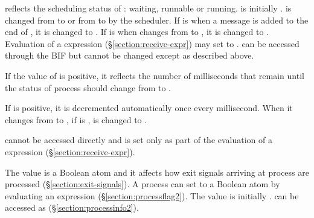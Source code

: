 \begin{Lentry}
\item[\T{status[\Z{P}]}]
 reflects the scheduling status of : waiting, runnable or running.
 is initially .
 is changed from  to
 or from  to  by the scheduler.
If  is  when a message is added to the end of
,
it is changed to .  If  is  when
 changes from  to , it is changed to .
Evaluation of a  expression (\S\ref{section:receive-expr}) may set
 to .
 can be accessed through the BIF  but
cannot be changed except as described above.

\item[\T{timer[\Z{P}]}]
If the value of  is positive, it reflects the number of milliseconds
that remain until the status of process  should change from
to .

If  is positive, it is decremented automatically once every millisecond.
When it changes from  to , if  is
,  is changed to .

 cannot be accessed directly and is set only as part of the evaluation of
a  expression (\S\ref{section:receive-expr}).

\item[\T{trap_exit[\Z{P}]}]
The value is a Boolean atom and it affects how exit signals arriving at process  are
processed (\S\ref{section:exit-signals}).
A process  can set  to a Boolean
atom  by evaluating an expression
 (\S\ref{section:processflag2}).
The value is initially .
 can be accessed as 
(\S\ref{section:processinfo2}).
\end{Lentry}
